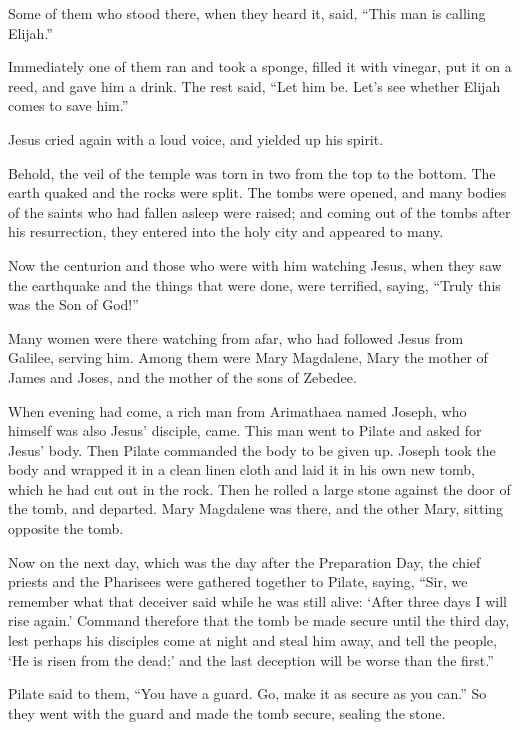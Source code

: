  Some of them who stood there, when they heard it, said,
``This man is calling Elijah.''

 Immediately one of them ran and took a sponge, filled it
with vinegar, put it on a reed, and gave him a drink.  The
rest said, ``Let him be. Let's see whether Elijah comes to save him.''

 Jesus cried again with a loud voice, and yielded up his
spirit.

 Behold, the veil of the temple was torn in two from the
top to the bottom. The earth quaked and the rocks were split.
 The tombs were opened, and many bodies of the saints who
had fallen asleep were raised;  and coming out of the tombs
after his resurrection, they entered into the holy city and appeared to
many.

 Now the centurion and those who were with him watching
Jesus, when they saw the earthquake and the things that were done, were
terrified, saying, ``Truly this was the Son of God!''

 Many women were there watching from afar, who had followed
Jesus from Galilee, serving him.  Among them were Mary
Magdalene, Mary the mother of James and Joses, and the mother of the
sons of Zebedee.

 When evening had come, a rich man from Arimathaea named
Joseph, who himself was also Jesus' disciple, came.  This
man went to Pilate and asked for Jesus' body. Then Pilate commanded the
body to be given up.  Joseph took the body and wrapped it
in a clean linen cloth  and laid it in his own new tomb,
which he had cut out in the rock. Then he rolled a large stone against
the door of the tomb, and departed.  Mary Magdalene was
there, and the other Mary, sitting opposite the tomb.

 Now on the next day, which was the day after the
Preparation Day, the chief priests and the Pharisees were gathered
together to Pilate,  saying, ``Sir, we remember what that
deceiver said while he was still alive: `After three days I will rise
again.'  Command therefore that the tomb be made secure
until the third day, lest perhaps his disciples come at night and steal
him away, and tell the people, `He is risen from the dead;' and the last
deception will be worse than the first.''

 Pilate said to them, ``You have a guard. Go, make it as
secure as you can.''  So they went with the guard and made
the tomb secure, sealing the stone.

